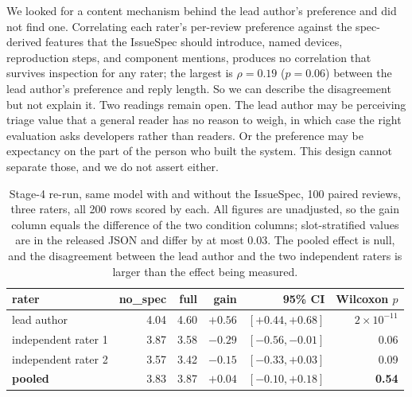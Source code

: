 \documentclass[preprint,12pt]{elsarticle}
\begin{document}
We looked for a content mechanism behind the lead author's preference and did not find one.
Correlating each rater's per-review preference against the spec-derived features that the
IssueSpec should introduce, named devices, reproduction steps, and component mentions, produces
no correlation that survives inspection for any rater; the largest is $\rho = 0.19$ ($p = 0.06$)
between the lead author's preference and reply length. So we can describe the disagreement but
not explain it. Two readings remain open. The lead author may be perceiving triage value that a
general reader has no reason to weigh, in which case the right evaluation asks developers rather
than readers. Or the preference may be expectancy on the part of the person who built the system.
This design cannot separate those, and we do not assert either.

\begin{table}[!htbp]\centering\footnotesize
\caption{Stage-4 re-run, same model with and without the IssueSpec, 100 paired reviews, three
raters, all 200 rows scored by each. All figures are unadjusted, so the gain column equals the difference of the two condition
columns; slot-stratified values are in the released JSON and differ by at most 0.03. The pooled
effect is null, and the disagreement between the lead author and the two independent raters is
larger than the effect being measured.}\label{tab:stage4-rerun}
\begin{tabular}{@{}lrrrrr@{}}\toprule
rater & no\_spec & full & gain & 95\% CI & Wilcoxon $p$ \\\midrule
lead author & 4.04 & 4.60 & $+0.56$ & $[+0.44, +0.68]$ & $2 \times 10^{-11}$ \\
independent rater 1 & 3.87 & 3.58 & $-0.29$ & $[-0.56, -0.01]$ & 0.06 \\
independent rater 2 & 3.57 & 3.42 & $-0.15$ & $[-0.33, +0.03]$ & 0.09 \\\midrule
\textbf{pooled} & 3.83 & 3.87 & $\mathbf{+0.04}$ & $[-0.10, +0.18]$ & \textbf{0.54} \\
\bottomrule\end{tabular}\end{table}
\end{document}
